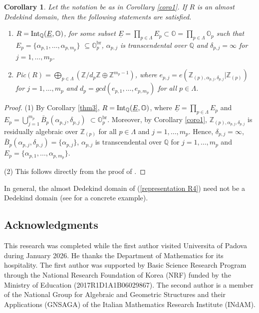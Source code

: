 \documentclass[10pt]{article}
\numberwithin{equation}{section}
\newtheorem{Cor}[equation]{Corollary}
\theoremstyle{definition}
\theoremstyle{definition}
\newcommand{\Q}{\mathbb{Q}}
\newcommand{\Z}{\mathbb{Z}}
\renewcommand{\O}{\mathbb{O}}
\newcommand{\Int}{\textnormal{Int}}
\newcommand{\IntQ}{\Int_{\Q}}
\newcommand{\uE}{\underline{E}}
\newcommand{\br}{\text{br}}
\begin{document}
\begin{Cor} \label{coro1-1}
Let the notation be as in Corollary \ref{coro1}.
If $R$ is an almost Dedekind domain, then
the following statements are satisfied. 
\begin{enumerate}
\item[{\em (1)}] $R = \IntQ(\uE,\O)$, for some subset $\uE=\prod\limits_{p\in\Lambda}E_p\subset\O=\prod\limits_{p\in\Lambda}\O_p$ 
such that $E_p = \{\alpha_{p,1}, \dots , \alpha_{p,m_p}\}$ $\subseteq \O_p^{\br}$, $\alpha_{p,j}$ is transcendental over $\Q$ and $\delta_{p,j}=\infty$ for $j=1,\ldots,m_p$.
\item[{\em (2)}] Pic$(R)= \bigoplus\limits_{p \in \Lambda}(\Z/d_p\Z \oplus \Z^{m_p-1})$, where
$e_{p,j} = e(\Z_{(p),\alpha_{p,j},\delta_{p,j}}|\Z_{(p)})$ for $j=1, \dots , m_p$ and $d_p= gcd(e_{p,1}, \dots , e_{p,m_p})$ for all $p \in \Lambda$.
\end{enumerate} 
\end{Cor}

\begin{proof}
(1)  By Corollary \ref{thm3}, $R = \IntQ(\uE,\O)$, where $\uE=\prod\limits_{p\in\Lambda} E_p$ and $E_p = \bigcup\limits_{j=1}^{m_p} \bar B_p(\alpha_{p,j},\delta_{p,j})$ $\subset\O_p^{\br}$.
Moreover, by Corollary \ref{coro1}, $\Z_{(p),\alpha_{p,j},\delta_{p,j}}$
is residually algebraic over $\Z_{(p)}$ for all $p \in \Lambda$ and $j =1, \dots, m_p$. Hence, $\delta_{p,j}=\infty$, $\bar B_p(\alpha_{p, j},\delta_{p,j}) = \{\alpha_{p, j}\}$, $\alpha_{p,j}$ is transcendental over $\Q$ for $j=1, \dots , m_p$ and $E_p = \{\alpha_{p,1}, \dots , \alpha_{p,m_p}\}$.

(2) This follows directly from the proof of \cite[Theorem 2.4(4)]{Chang}.
\end{proof} 


In general, the almost Dedekind domain of (\ref{representation R4}) need not be a Dedekind domain 
(see \cite[Theorems 3.1 and 3.5]{Chang} for a concrete example).



\subsection*{Acknowledgments}
This research was completed while the first author visited Universita of Padova during January 2026. He thanks the Department of Mathematics for its hospitality. The first author was supported by Basic Science Research Program through the National Research Foundation of Korea (NRF) funded by the Ministry of Education (2017R1D1A1B06029867). The second author  is a member of the National Group for Algebraic and Geometric Structures and their Applications (GNSAGA) of the Italian Mathematics Research Institute (INdAM). 
 
\end{document}
